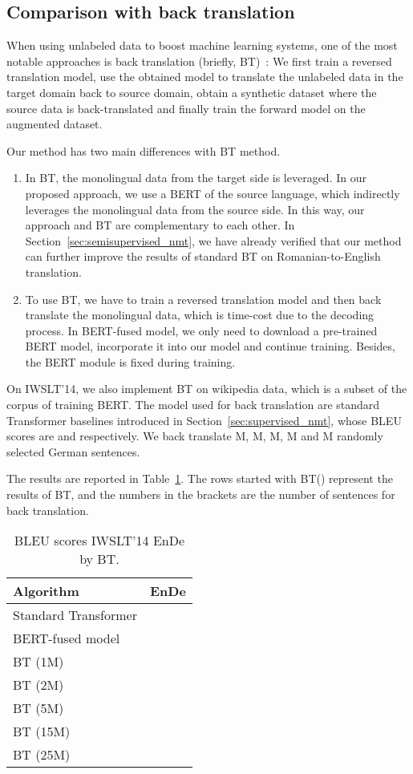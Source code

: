 \documentclass{article} \usepackage{iclr2020_conference,times}
\begin{document}
\subsection{Comparison with back translation}
When using unlabeled data to boost machine learning systems, one of the most notable approaches is back translation (briefly, BT)~\citep{sennrich2016improving}: We first train a reversed translation model, use the obtained model to translate the unlabeled data in the target domain back to source domain, obtain a synthetic dataset where the source data is back-translated and finally train the forward model on the augmented dataset. 

Our method has two main differences with BT method. 
\begin{enumerate}
\item In BT, the monolingual data from the target side is leveraged. In our proposed approach, we use a BERT of the source language, which indirectly leverages the monolingual data from the source side. In this way, our approach and BT are complementary to each other. In Section~\ref{sec:semisupervised_nmt}, we have already verified that our method can further improve the results of standard BT on Romanian-to-English translation.
\item To use BT, we have to train a reversed translation model and then back translate the monolingual data, which is time-cost due to the decoding process. In BERT-fused model, we only need to download a pre-trained BERT model, incorporate it into our model and continue training. Besides, the BERT module is fixed during training.
\end{enumerate}

On IWSLT'14, we also implement BT on wikipedia data, which is a subset of the corpus of training BERT. The model used for back translation are standard Transformer baselines introduced in Section~\ref{sec:supervised_nmt}, whose BLEU scores are  and  respectively. We back translate M, M, M, M and M randomly selected German sentences. 

The results are reported in Table~\ref{tab:results_bt_wiki}. The rows started with BT() represent the results of BT, and the numbers in the brackets are the number of sentences for back translation. 



\begin{table}[!htbp]
\centering
\caption{BLEU scores IWSLT'14 EnDe by BT.}
\begin{tabular}{lc}
\toprule
Algorithm & EnDe  \\
\midrule
Standard Transformer &  \\
BERT-fused model &   \\
\midrule
BT (1M)  &  \\
BT (2M)  &  \\
BT (5M)  & \\
BT (15M) &  \\
BT (25M) &  \\
\bottomrule
\end{tabular}
\label{tab:results_bt_wiki}
\end{table}
\end{document}
